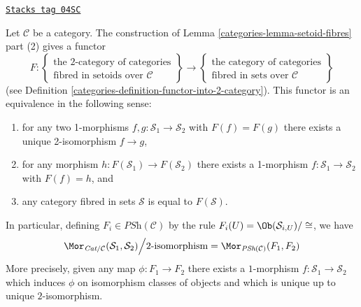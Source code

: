 \begin{lemma}
\label{categories-lemma-2-category-fibred-setoids}
\href{https://stacks.math.columbia.edu/tag/04SC}{\texttt{Stacks tag 04SC}}

Let $\mathcal{C}$ be a category. The construction of
Lemma \ref{categories-lemma-setoid-fibres}
part (2) gives a functor
$$
F :
\left\{
\begin{matrix}
\text{the 2-category of categories}\\
\text{fibred in setoids over }\mathcal{C}
\end{matrix}
\right\}
\longrightarrow
\left\{
\begin{matrix}
\text{the category of categories}\\
\text{fibred in sets over }\mathcal{C}
\end{matrix}
\right\}
$$
(see
Definition \ref{categories-definition-functor-into-2-category}).
This functor is an equivalence in the following sense:
\begin{enumerate}
\item for any two 1-morphisms $f, g : \mathcal{S}_1 \to \mathcal{S}_2$
with $F(f) = F(g)$ there exists a unique 2-isomorphism $f \to g$,
\item for any morphism $h : F(\mathcal{S}_1) \to F(\mathcal{S}_2)$
there exists a 1-morphism $f : \mathcal{S}_1 \to \mathcal{S}_2$
with $F(f) = h$, and
\item any category fibred in sets $\mathcal{S}$ is equal to $F(\mathcal{S})$.
\end{enumerate}
In particular, defining $F_i \in \textit{PSh}(\mathcal{C})$ by the
rule $F_i(U) = \Ob(\mathcal{S}_{i, U})/\cong$, we have
$$
\Mor_{\textit{Cat}/\mathcal{C}}(\mathcal{S}_1, \mathcal{S}_2)
\Big/
2\text{-isomorphism}
=
\Mor_{\textit{PSh}(\mathcal{C})}(F_1, F_2)
$$
More precisely, given any map $\phi : F_1 \to F_2$ there exists a
$1$-morphism $f : \mathcal{S}_1 \to \mathcal{S}_2$ which induces
$\phi$ on isomorphism classes of objects and
which is unique up to unique $2$-isomorphism.
\end{lemma}

